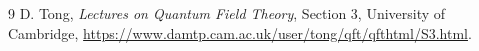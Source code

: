 \begin{thebibliography}{9}\small
{} D. Tong, \emph{Lectures on Quantum Field Theory}, Section 3, University of Cambridge, \url{https://www.damtp.cam.ac.uk/user/tong/qft/qfthtml/S3.html}.
\end{thebibliography}
